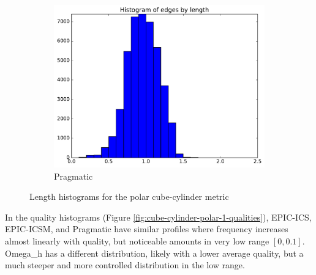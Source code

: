 \documentclass[3p,times,procedia,number]{elsarticle}
\begin{document}
\begin{figure}
\begin{subfigure}{.24\textwidth}
\includegraphics[width=\textwidth]{pragmatic-cube-cylinder-polar-1-length.pdf}
\caption{Pragmatic}
\end{subfigure}
\caption{Length histograms for the polar cube-cylinder metric}
\label{fig:cube-cylinder-polar-1-lengths}
\end{figure}

In the quality histograms (Figure \ref{fig:cube-cylinder-polar-1-qualities}),
EPIC-ICS, EPIC-ICSM, and Pragmatic have similar
profiles where frequency increases almost linearly with quality, but noticeable
amounts in very low range $[0,0.1]$.
Omega\_h has a different distribution, likely with a lower average quality,
but a much steeper and more controlled distribution in the low range.
\end{document}
